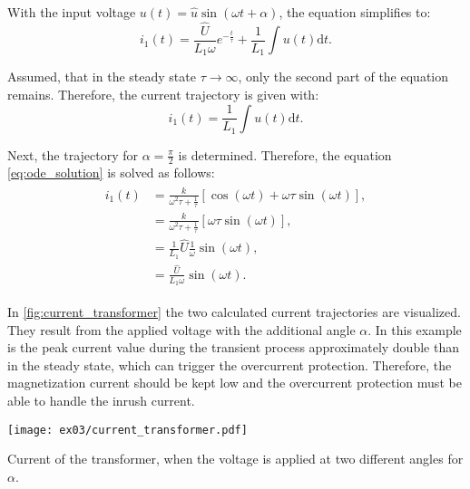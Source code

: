 \begin{solutionblock}
  With the input voltage $u(t) = \hat{u}\sin(\omega t + \alpha)$, the equation simplifies to:
  \begin{equation}
    i_{\mathrm{1}}(t) = \frac{\hat{U}}{L_{\mathrm{1}}\omega}e^{-\frac{t}{\tau}} + \frac{1}{L_{\mathrm{1}}} \int u(t) \mathrm{d}t.
  \end{equation}

  Assumed, that in the steady state $\tau \rightarrow \infty$, only the second part of the equation remains. Therefore, the current trajectory is given with:
  \begin{equation}
    i_{\mathrm{1}}(t) = \frac{1}{L_{\mathrm{1}}} \int u(t) \mathrm{d}t.
  \end{equation}

  Next, the trajectory for $\alpha = \frac{\pi}{2}$ is determined. Therefore, the equation \eqref{eq:ode_solution} is solved as follows:
  \begin{align}
    \begin{split}
      i_{\mathrm{1}}(t) &= \frac{k}{\omega^2\tau + \frac{1}{\tau}}
      \left[\cos(\omega t) + \omega \tau \sin(\omega t) \right], \\
      &= \frac{k}{\omega^2\tau + \frac{1}{\tau}} \left[\omega \tau \sin(\omega t) \right], \\
      &= \frac{1}{L_{\mathrm{1}}} \hat{U} \frac{1}{\omega} \sin(\omega t), \\
      &= \frac{\hat{U}}{L_{\mathrm{1}}\omega} \sin(\omega t).
    \end{split}
  \end{align}


  In \autoref{fig:current_transformer} the two calculated current trajectories are visualized. They result from the applied voltage with the additional angle $\alpha$.
  In this example is the peak current value during the transient process approximately double than in the steady state, which can trigger the overcurrent protection. Therefore, the magnetization current should be kept low and the overcurrent protection must be able to handle the inrush current.
  \begin{solutionfigure}[h!]
    \centering
    \texttt{[image: ex03/current\_transformer.pdf]}
    \caption{Current of the transformer, when the voltage is applied at two different angles for $\alpha$.}
    \label{fig:current_transformer}
  \end{solutionfigure}
  

\end{solutionblock}